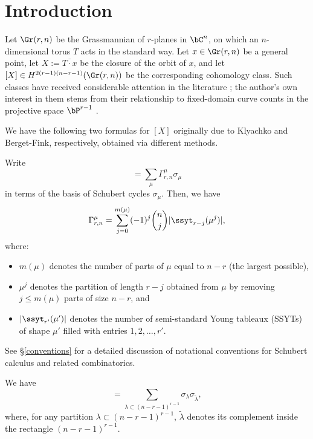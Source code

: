 \section{Introduction}

Let $\Gr(r,n)$ be the Grassmannian of $r$-planes in $\bC^n$, on which an $n$-dimensional torus $T$ acts in the standard way. Let $x\in \Gr(r,n)$ be a general point, let $X:=\overline{T\cdot x}$ be the closure of the orbit of $x$, and let $[X]\in H^{2(r-1)(n-r-1)}(\Gr(r,n))$ be the corresponding cohomology class. Such classes have received considerable attention in the literature \cite{K85,Spe09,BF17,LPST20,NT23}; the author's own interest in them stems from their relationship to fixed-domain curve counts in the projective space $\bP^{r-1}$ \cite{L23}.


We have the following two formulas for $[X]$ originally due to Klyachko and Berget-Fink, respectively, obtained via different methods.

\begin{thm}[{\cite[Theorem 6]{K85}}]\label{k_formula}
Write
\begin{equation*}
[X]=\sum_{\mu} \Gamma^\mu_{r,n}\sigma_{\mu}
\end{equation*}
in terms of the basis of Schubert cycles $\sigma_\mu$. Then, we have
\begin{equation*}
\Gamma^\mu_{r,n}=\sum_{j=0}^{m(\mu)}(-1)^j\binom{n}{j}|\ssyt_{r-j}(\mu^j)|,
\end{equation*}
where:
\begin{itemize}
\item $m(\mu)$ denotes the number of parts of $\mu$ equal to $n-r$ (the largest possible), 
\item $\mu^j$ denotes the partition of length $r-j$ obtained from $\mu$ by removing $j\le m(\mu)$ parts of size $n-r$, and
\item $|\ssyt_{r'}(\mu')|$ denotes the number of semi-standard Young tableaux (SSYTs) of shape $\mu'$ filled with entries $1,2,\ldots,r'$.
\end{itemize}
\end{thm}

See \S\ref{conventions} for a detailed discussion of notational conventions for Schubert calculus and related combinatorics.

\begin{thm}[{\cite[Theorem 5.1]{BF17}}]\label{bf_formula}
We have
\begin{equation*}
[X]=\sum_{\lambda\subset(n-r-1)^{r-1}}\sigma_{\lambda}\sigma_{\widetilde{\lambda}},
\end{equation*}
where, for any partition $\lambda\subset(n-r-1)^{r-1}$, $\widetilde{\lambda}$ denotes its complement inside the rectangle $(n-r-1)^{r-1}$.
\end{thm}

